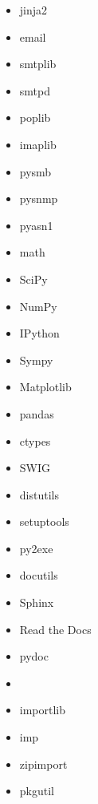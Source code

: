 \documentclass{article}
\begin{document}
\begin{enumerate}
\begin{itemize}
            \item jinja2

            \item email
            \item smtplib
            \item smtpd
            \item poplib
            \item imaplib

            \item pysmb

            \item pysnmp

            \item pyasn1

            \item math
            \item SciPy
            \item NumPy
            \item IPython
            \item Sympy
            \item Matplotlib
            \item pandas

            \item ctypes
            \item SWIG

            \item distutils
            \item setuptools
            \item py2exe

            \item docutils
            \item Sphinx
            \item Read the Docs
            \item pydoc

            \item

            \item importlib
            \item imp
            \item zipimport
            \item pkgutil


\end{itemize}
\end{enumerate}
\end{document}
